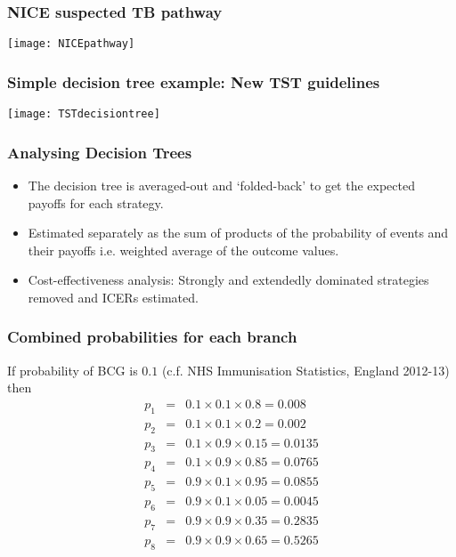 \documentclass[t]{beamer}
\begin{document}
\begin{frame}
\frametitle{NICE suspected TB pathway}
 \texttt{[image: NICEpathway]}
\end{frame} 

\begin{frame}
\frametitle{Simple decision tree example: New TST guidelines}
 \texttt{[image: TSTdecisiontree]}
\end{frame}

\begin{frame}
\frametitle{Analysing Decision Trees}
	\begin{itemize}
		\item The decision tree is averaged-out and `folded-back' to get the expected payoffs for each strategy.
		\item Estimated separately as the sum of products of the probability of events and their payoffs i.e.
\alert{weighted average} of the outcome values.
		\item Cost-effectiveness analysis: Strongly and extendedly dominated strategies removed and ICERs estimated.
	\end{itemize}
\end{frame}

\begin{frame}
\frametitle{Combined probabilities for each branch}
 If probability of BCG is $0.1$ (c.f. NHS Immunisation Statistics, England 2012-13) then
\begin{eqnarray*}
p_1 &=& 0.1 \times 0.1 \times 0.8 = 0.008\\
p_2 &=& 0.1 \times 0.1 \times 0.2 = 0.002\\
p_3 &=& 0.1 \times 0.9 \times 0.15 = 0.0135\\
p_4 &=& 0.1 \times 0.9 \times 0.85 = 0.0765\\
p_5 &=& 0.9 \times 0.1 \times 0.95 = 0.0855\\
p_6 &=& 0.9 \times 0.1 \times 0.05 = 0.0045\\
p_7 &=& 0.9 \times 0.9 \times 0.35 = 0.2835\\
p_8 &=& 0.9 \times 0.9 \times 0.65 = 0.5265
\end{eqnarray*}
\end{frame}
\end{document}
